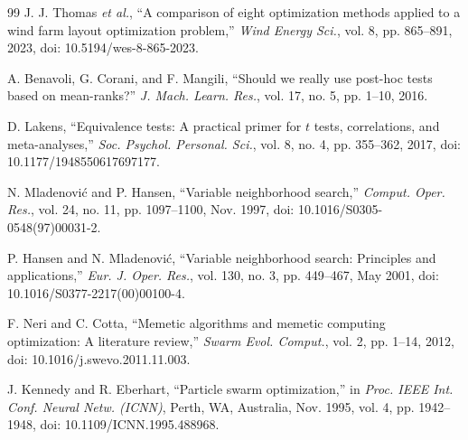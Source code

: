 {\begin{thebibliography}{99}
J. J. Thomas \textit{et al.}, ``A comparison of eight optimization methods applied to a wind farm layout optimization problem,'' \textit{Wind Energy Sci.}, vol. 8, pp. 865--891, 2023, doi: 10.5194/wes-8-865-2023.

A. Benavoli, G. Corani, and F. Mangili, ``Should we really use post-hoc tests based on mean-ranks?'' \textit{J. Mach. Learn. Res.}, vol. 17, no. 5, pp. 1--10, 2016.

D. Lakens, ``Equivalence tests: A practical primer for $t$ tests, correlations, and meta-analyses,'' \textit{Soc. Psychol. Personal. Sci.}, vol. 8, no. 4, pp. 355--362, 2017, doi: 10.1177/1948550617697177.

N. Mladenovi\'c and P. Hansen, ``Variable neighborhood search,'' \textit{Comput. Oper. Res.}, vol. 24, no. 11, pp. 1097--1100, Nov. 1997, doi: 10.1016/S0305-0548(97)00031-2.

P. Hansen and N. Mladenovi\'c, ``Variable neighborhood search: Principles and applications,'' \textit{Eur. J. Oper. Res.}, vol. 130, no. 3, pp. 449--467, May 2001, doi: 10.1016/S0377-2217(00)00100-4.

F. Neri and C. Cotta, ``Memetic algorithms and memetic computing optimization: A literature review,'' \textit{Swarm Evol. Comput.}, vol. 2, pp. 1--14, 2012, doi: 10.1016/j.swevo.2011.11.003.

J. Kennedy and R. Eberhart, ``Particle swarm optimization,'' in \textit{Proc. IEEE Int. Conf. Neural Netw. (ICNN)}, Perth, WA, Australia, Nov. 1995, vol. 4, pp. 1942--1948, doi: 10.1109/ICNN.1995.488968.


\end{thebibliography}}
